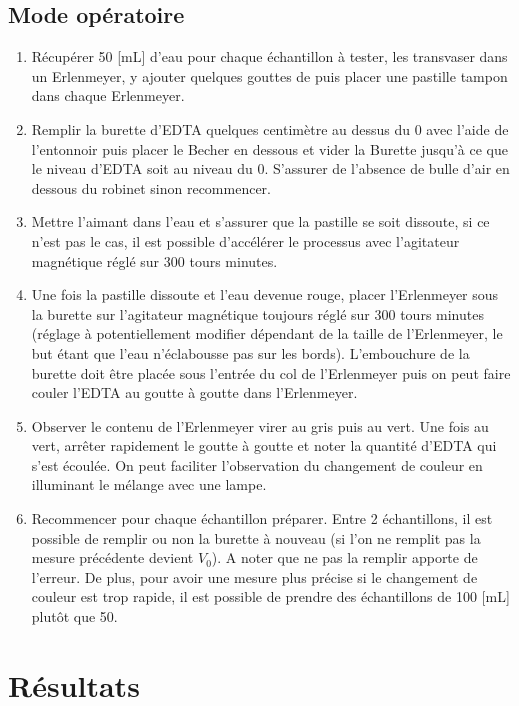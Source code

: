 \documentclass[11pt]{article}
\begin{document}
\subsection{Mode opératoire}
\begin{enumerate}
    \item Récupérer 50 [mL] d'eau pour chaque échantillon à tester, les transvaser dans un Erlenmeyer, y ajouter quelques gouttes de  puis placer une pastille tampon dans chaque Erlenmeyer.
    \item Remplir la burette d'EDTA quelques centimètre au dessus du 0 avec l'aide de l'entonnoir puis placer le Becher en dessous et vider la Burette jusqu'à ce que le niveau d'EDTA soit au niveau du 0. S'assurer de l'absence de bulle d'air en dessous du robinet sinon recommencer.
    \item Mettre l'aimant dans l'eau et s'assurer que la pastille se soit dissoute, si ce n'est pas le cas, il est possible d'accélérer le processus avec l'agitateur magnétique réglé sur 300 tours minutes.
    \item Une fois la pastille dissoute et l'eau devenue rouge, placer l'Erlenmeyer sous la burette sur l'agitateur magnétique toujours réglé sur 300 tours minutes (réglage à potentiellement modifier dépendant de la taille de l'Erlenmeyer, le but étant que l'eau n'éclabousse pas sur les bords). L'embouchure de la burette doit être placée sous l'entrée du col de l'Erlenmeyer puis on peut faire couler l'EDTA au goutte à goutte dans l'Erlenmeyer.
    \item Observer le contenu de l'Erlenmeyer virer au gris puis au vert. Une fois au vert, arrêter rapidement le goutte à goutte et noter la quantité d'EDTA qui s'est écoulée. On peut faciliter l'observation du changement de couleur en illuminant le mélange avec une lampe.
    \item Recommencer pour chaque échantillon préparer. Entre 2 échantillons, il est possible de remplir ou non la burette à nouveau (si l'on ne remplit pas la mesure précédente devient $V_0$). A noter que ne pas la remplir apporte de l'erreur. De plus, pour avoir une mesure plus précise si le changement de couleur est trop rapide, il est possible de prendre des échantillons de 100 [mL] plutôt que 50.
\end{enumerate}

\section{Résultats}
\label{sec:res}
\end{document}
